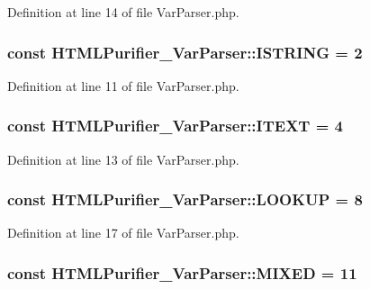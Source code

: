 Definition at line 14 of file Var\+Parser.\+php.

\hypertarget{classHTMLPurifier__VarParser_a1d87ae5b275086cc3359f3347c36173e}{
\subsubsection[{I\+S\+T\+R\+I\+N\+G}]{\setlength{\rightskip}{0pt plus 5cm}const H\+T\+M\+L\+Purifier\+\_\+\+Var\+Parser\+::\+I\+S\+T\+R\+I\+N\+G = 2}}\label{classHTMLPurifier__VarParser_a1d87ae5b275086cc3359f3347c36173e}


Definition at line 11 of file Var\+Parser.\+php.

\hypertarget{classHTMLPurifier__VarParser_a6573b18b6e7f5d97f75ceefa074693a3}{
\subsubsection[{I\+T\+E\+X\+T}]{\setlength{\rightskip}{0pt plus 5cm}const H\+T\+M\+L\+Purifier\+\_\+\+Var\+Parser\+::\+I\+T\+E\+X\+T = 4}}\label{classHTMLPurifier__VarParser_a6573b18b6e7f5d97f75ceefa074693a3}


Definition at line 13 of file Var\+Parser.\+php.

\hypertarget{classHTMLPurifier__VarParser_a72f3c2600fc72784fbad831239a9b789}{
\subsubsection[{L\+O\+O\+K\+U\+P}]{\setlength{\rightskip}{0pt plus 5cm}const H\+T\+M\+L\+Purifier\+\_\+\+Var\+Parser\+::\+L\+O\+O\+K\+U\+P = 8}}\label{classHTMLPurifier__VarParser_a72f3c2600fc72784fbad831239a9b789}


Definition at line 17 of file Var\+Parser.\+php.

\hypertarget{classHTMLPurifier__VarParser_a872664f6dd6287737d31a8840e133027}{
\subsubsection[{M\+I\+X\+E\+D}]{\setlength{\rightskip}{0pt plus 5cm}const H\+T\+M\+L\+Purifier\+\_\+\+Var\+Parser\+::\+M\+I\+X\+E\+D = 11}}\label{classHTMLPurifier__VarParser_a872664f6dd6287737d31a8840e133027}


